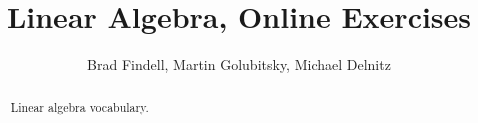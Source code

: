 \documentclass[numbers,nooutcomes,twoside,hints]{xourse}
\title{Linear Algebra, Online Exercises}
\author{Brad Findell, Martin Golubitsky, Michael Delnitz}
\begin{document}
\begin{abstract}
Linear algebra vocabulary.  
\end{abstract}
\maketitle





\end{document}
